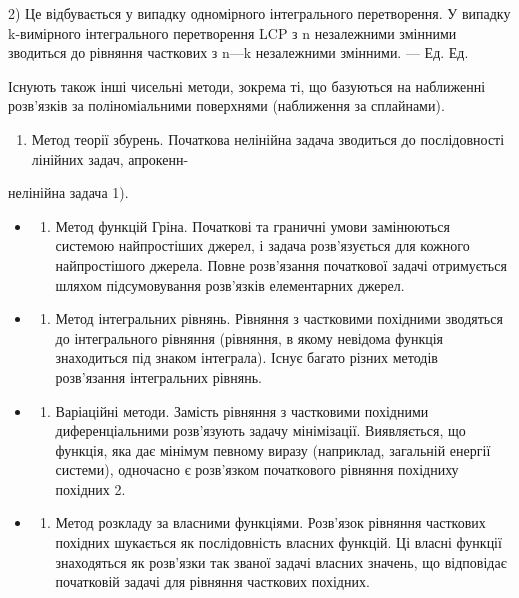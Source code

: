 \documentclass[
  ukrainian,
]{article}
\providecommand{\tightlist}{%
  \setlength{\itemsep}{0pt}\setlength{\parskip}{0pt}}
\begin{document}
2) Це відбувається у випадку одномірного інтегрального перетворення. У
випадку k-вимірного інтегрального перетворення LCP з n незалежними
змінними зводиться до рівняння часткових з n---k незалежними змінними.
--- Ед. Ед.

Існують також інші чисельні методи, зокрема ті, що базуються на
наближенні розв'язків за поліноміальними поверхнями (наближення за
сплайнами).

\begin{enumerate}
\def\labelenumi{\arabic{enumi}.}
\setcounter{enumi}{5}
\tightlist
\item
  Метод теорії збурень. Початкова нелінійна задача зводиться до
  послідовності лінійних задач, апрокенн-
\end{enumerate}

нелінійна задача 1).

\begin{itemize}
\tightlist
\item
  \begin{enumerate}
  \def\labelenumi{\arabic{enumi}.}
  \setcounter{enumi}{6}
  \tightlist
  \item
    Метод функцій Гріна. Початкові та граничні умови замінюються
    системою найпростіших джерел, і задача розв'язується для кожного
    найпростішого джерела. Повне розв'язання початкової задачі
    отримується шляхом підсумовування розв'язків елементарних джерел.
  \end{enumerate}
\item
  \begin{enumerate}
  \def\labelenumi{\arabic{enumi}.}
  \setcounter{enumi}{7}
  \tightlist
  \item
    Метод інтегральних рівнянь. Рівняння з частковими похідними
    зводяться до інтегрального рівняння (рівняння, в якому невідома
    функція знаходиться під знаком інтеграла). Існує багато різних
    методів розв'язання інтегральних рівнянь.
  \end{enumerate}
\item
  \begin{enumerate}
  \def\labelenumi{\arabic{enumi}.}
  \setcounter{enumi}{8}
  \tightlist
  \item
    Варіаційні методи. Замість рівняння з частковими похідними
    диференціальними розв'язують задачу мінімізації. Виявляється, що
    функція, яка дає мінімум певному виразу (наприклад, загальній
    енергії системи), одночасно є розв'язком початкового рівняння
    похідниху похідних 2.
  \end{enumerate}
\item
  \begin{enumerate}
  \def\labelenumi{\arabic{enumi}.}
  \setcounter{enumi}{9}
  \tightlist
  \item
    Метод розкладу за власними функціями. Розв'язок рівняння часткових
    похідних шукається як послідовність власних функцій. Ці власні
    функції знаходяться як розв'язки так званої задачі власних значень,
    що відповідає початковій задачі для рівняння часткових похідних.
  \end{enumerate}
\end{itemize}
\end{document}
